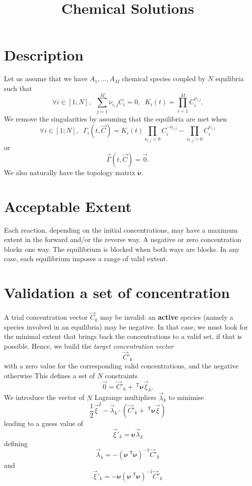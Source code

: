 \documentclass[aps]{revtex4}
\newcommand{\mymat}[1]{\bm{#1}}
\newcommand{\mytrn}[1]{~^{\mathsf{T}}{#1}}
\begin{document}
\title{Chemical Solutions}

\section{Description}
Let us assume that we have $A_1,\ldots,A_M$ chemical species coupled by
$N$ equilibria such that
\begin{equation}
	\forall i \in [1;N], \;\; \sum_{j=1}^{M} \nu_{i,j} C_i = 0, \;\; K_i(t) = \prod_{i=1}^{M} C_i^{\nu_{i,j}}.
\end{equation}
We remove the singularities by assuming that the equilibria are met when
\begin{equation}
	\forall i \in [1;N], \;\; \Gamma_i(t,\vec{C}) = K_i(t) \prod_{\nu_{i,j}<0}  C_i^{-\nu_{i,j}} -  \prod_{\nu_{i,j}>0} C_i^{\nu_{i,j}} 
\end{equation}
or
\begin{equation}
	\vec{\Gamma}(t,\vec{C}) = \vec{0}.
\end{equation}
We also naturally have the topology matrix $\mymat{\nu}$.

\section{Acceptable Extent}
Each reaction, depending on the initial concentrations, may have a maximum extent in the forward and/or the reverse way.
A negative or zero concentration blocks one way. The equilibrium is blocked when both ways are blocks.
In any case, each equilibrium imposes a range of valid extent.

\section{Validation a set of concentration}
A trial concentration vector $\vec{C}_k$ may be invalid: an \textbf{active} species (namely a species involved in an equilibria)
may be negative. In that case, we must look for the minimal extent that brings back the concentrations to a valid set, if that
is possible.
Hence, we build the \textit{target concentration vector}
$$
	\vec{C}'_k
$$
with a zero value for the corresponding valid concentrations, and  the negative otherwise
This defines a set of $N$ constraints
$$
	\vec{0} = \vec{C}'_k + \mytrn{\mymat{\nu}}\vec{\xi}_k.
$$
We introduce the vector of $N$ Lagrange multipliers $\vec{\lambda}_k$ to minimise
$$
	\dfrac{1}{2} \vec{\xi}^2 - \vec{\lambda}_k \cdot \left( \vec{C}'_k + \mytrn{\mymat{\nu}}\vec{\xi}\right)
$$
leading to a guess value of
$$
	\vec{\xi}'_k = \mymat{\nu}\vec{\lambda}_k
$$
defining
$$
	\vec{\lambda}_k = - \left(\mymat{\nu}\mytrn{\mymat{\nu}}\right)^{-1} \vec{C}'_k
$$
and
$$
	\vec{\xi}'_k = - \mymat{\nu} \left(\mymat{\nu}\mytrn{\mymat{\nu}}\right)^{-1} \vec{C}'_k
$$
\end{document}
